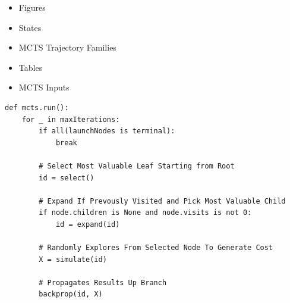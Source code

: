 \documentclass[letterpaper, preprint, paper,11pt]{AAS}	%
\begin{document}
\begin{itemize}
    \item Figures
        \item States 
        \item MCTS Trajectory Families
    \item Tables
        \item MCTS Inputs
\end{itemize}


\begin{lstlisting}
def mcts.run():
    for _ in maxIterations:
        if all(launchNodes is terminal):
            break

        # Select Most Valuable Leaf Starting from Root
        id = select() 

        # Expand If Prevously Visited and Pick Most Valuable Child
        if node.children is None and node.visits is not 0:
            id = expand(id)

        # Randomly Explores From Selected Node To Generate Cost
        X = simulate(id) 

        # Propagates Results Up Branch
        backprop(id, X)
\end{lstlisting}
\fi

\appendix
\newpage
\end{document}
